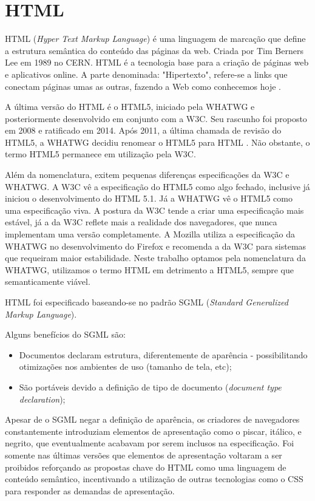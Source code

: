 \documentclass[
12pt,
a4paper,
portuges,
draft
]{report}
\begin{document}
\section{HTML}

HTML (\textit{Hyper Text Markup Language}) é uma linguagem de
marcação que define a estrutura semântica do conteúdo das páginas
da web. Criada por Tim Berners Lee em 1989 no CERN. HTML é a tecnologia
base para a criação de páginas web e aplicativos online. A parte
denominada: "Hipertexto", refere-se a links que conectam páginas umas
as outras, fazendo a Web como conhecemos hoje
\autocite{mdn2015}.

A última versão do HTML é o HTML5, iniciado pela WHATWG
e posteriormente desenvolvido em conjunto com a W3C.
Seu rascunho foi proposto em 2008 e ratificado em 2014.
Após 2011, a última chamada de revisão do HTML5,
a WHATWG decidiu renomear o HTML5 para HTML
\autocite{htmlIsTheNewHtml5}. Não obstante, o termo HTML5
permanece em utilização pela W3C.

Além da nomenclatura, exitem pequenas diferenças especificações da W3C e WHATWG. A
W3C vê a especificação do HTML5 como algo fechado, inclusive já
iniciou o desenvolvimento do HTML 5.1. Já a WHATWG vê o HTML5 como uma
especificação viva. A postura da W3C tende a criar uma especificação
mais estável, já a da W3C reflete mais a realidade dos navegadores,
que nunca implementam uma versão completamente. A Mozilla utiliza a
especificação da WHATWG no desenvolvimento do Firefox e recomenda a
da W3C para sistemas que requeiram maior estabilidade. Neste trabalho
optamos pela nomenclatura da WHATWG, utilizamos o termo HTML em
detrimento a HTML5, sempre que semanticamente viável.

HTML foi especificado baseando-se no padrão SGML (\textit{Standard Generalized
Markup Language}).

Alguns benefícios do SGML são:
\begin{itemize}
    \item Documentos declaram estrutura, diferentemente de aparência
- possibilitando otimizações nos ambientes de uso (tamanho de tela,
etc);
    \item São portáveis devido a definição de tipo de documento
(\textit{document type declaration});
\end{itemize}

Apesar de o SGML negar a definição de aparência, os criadores de
navegadores constantemente introduziam elementos de apresentação como o
piscar, itálico, e negrito, que eventualmente acabavam por serem inclusos
na especificação. Foi somente nas últimas versões que elementos de
apresentação voltaram a ser proibidos reforçando as propostas chave
do HTML como uma linguagem de conteúdo semântico, incentivando a
utilização de outras tecnologias como o CSS para responder as demandas de
apresentação.
\end{document}

